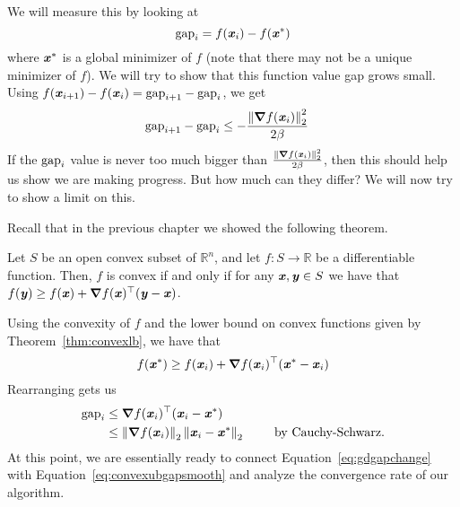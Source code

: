 We will measure this by looking at
\[
  \text{gap}_i =  f(\boldsymbol{\mathit{x}}_{i}) - f(\boldsymbol{\mathit{x}}^*)
  \]
  where $\boldsymbol{\mathit{x}}^*$ is a global minimizer of $f$ (note that there may not
  be a unique minimizer of $f$).
We will try to show that this function value gap grows small.
Using $f(\boldsymbol{\mathit{x}}_{i+1})- f(\boldsymbol{\mathit{x}}_{i}) =
  \text{gap}_{i+1}- \text{gap}_i $, we get
\begin{align}
\label{eq:gdgapchange}
 \text{gap}_{i+1}- \text{gap}_i &\leq - \frac{\left\| \boldsymbol{\nabla}
  f(\boldsymbol{\mathit{x}}_{i}) \right\|_2^2}{2\beta}
\end{align}
If the $\text{gap}_i$  value is never too much bigger than $\frac{\left\| \boldsymbol{\nabla}
  f(\boldsymbol{\mathit{x}}_{i}) \right\|_2^2}{2\beta}$, then this should help us show we are making
progress.
But how much can they differ? We will now try to show a limit on this.

Recall that in the previous chapter we showed the following theorem.
\begin{theorem}\label{thm:convexlb}
Let  $S$ be an open convex subset of $\mathbb{R}^n$, and
let $f:S\to \mathbb{R}$ be a differentiable function.
Then, $f$ is convex if and only if for any $\boldsymbol{\mathit{x}},\boldsymbol{\mathit{y}} \in S$ we have that $f(\boldsymbol{\mathit{y}}) \geq f(\boldsymbol{\mathit{x}}) + \boldsymbol{\nabla} f(\boldsymbol{\mathit{x}})^\top  (\boldsymbol{\mathit{y}}-\boldsymbol{\mathit{x}})$.
\end{theorem}


Using the convexity of $f$ and the lower bound on
convex functions given by Theorem~\ref{thm:convexlb}, we have that
\begin{align}
\label{eq:basiciterlb}
f(\boldsymbol{\mathit{x}}^*) \geq f(\boldsymbol{\mathit{x}}_i) + \boldsymbol{\nabla} f(\boldsymbol{\mathit{x}}_{i})^\top (\boldsymbol{\mathit{x}}^* - \boldsymbol{\mathit{x}}_i)
\end{align}
Rearranging gets us
\begin{align}
\label{eq:convexubgapsmooth}
  \text{gap}_i &\leq \boldsymbol{\nabla} f(\boldsymbol{\mathit{x}}_{i})^\top (\boldsymbol{\mathit{x}}_i - \boldsymbol{\mathit{x}}^*)
  \\
 & \leq \left\| \boldsymbol{\nabla} f(\boldsymbol{\mathit{x}}_{i}) \right\|_2 \left\| \boldsymbol{\mathit{x}}_i - \boldsymbol{\mathit{x}}^* \right\|_2
            \tag*{ by Cauchy-Schwarz.}
\end{align}
At this point, we are essentially ready to connect
Equation~\eqref{eq:gdgapchange} with Equation~\eqref{eq:convexubgapsmooth}
and analyze the convergence rate of our algorithm.


